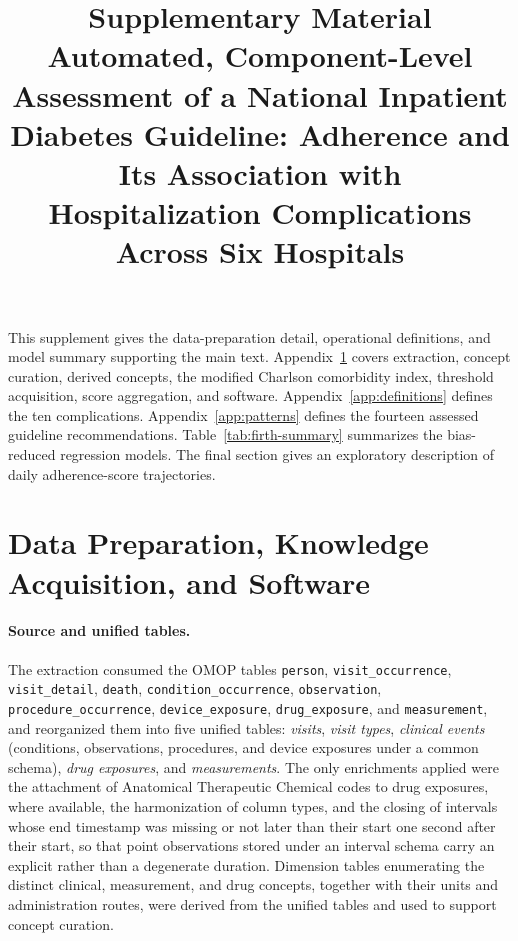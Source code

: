 \documentclass[11pt,a4paper]{article}
\title{\bfseries Supplementary Material\\[0.4em]
\large Automated, Component-Level Assessment of a National Inpatient
Diabetes Guideline: Adherence and Its Association with Hospitalization
Complications Across Six Hospitals}
\author{}
\date{}
\begin{document}
\maketitle

\noindent
This supplement gives the data-preparation detail, operational definitions,
and model summary supporting the main text. Appendix~\ref{app:data-prep}
covers extraction, concept curation, derived concepts, the modified Charlson
comorbidity index, threshold acquisition, score aggregation, and software.
Appendix~\ref{app:definitions} defines the ten complications.
Appendix~\ref{app:patterns} defines the fourteen assessed guideline
recommendations. Table~\ref{tab:firth-summary} summarizes the bias-reduced
regression models. The final section gives an exploratory description of daily
adherence-score trajectories.

\section{Data Preparation, Knowledge Acquisition, and Software}
\label{app:data-prep}

\paragraph{Source and unified tables.}
The extraction consumed the OMOP tables \texttt{person},
\texttt{visit\_\allowbreak{}occurrence}, \texttt{visit\_\allowbreak{}detail}, \texttt{death},
\texttt{condition\_\allowbreak{}occurrence}, \texttt{observation},
\texttt{procedure\_\allowbreak{}occurrence}, \texttt{device\_\allowbreak{}exposure},
\texttt{drug\_\allowbreak{}exposure}, and \texttt{measurement}, and reorganized them into
five unified tables: \emph{visits}, \emph{visit types}, \emph{clinical
events} (conditions, observations, procedures, and device exposures under a
common schema), \emph{drug exposures}, and \emph{measurements}. The only
enrichments applied were the attachment of Anatomical Therapeutic Chemical
codes to drug exposures, where available, the harmonization of column types,
and the closing of intervals whose end timestamp was missing or not later
than their start one second after their start, so that point observations
stored under an interval schema carry an explicit rather than a degenerate
duration. Dimension tables enumerating the distinct clinical, measurement,
and drug concepts, together with their units and administration routes, were
derived from the unified tables and used to support concept curation.
\end{document}
